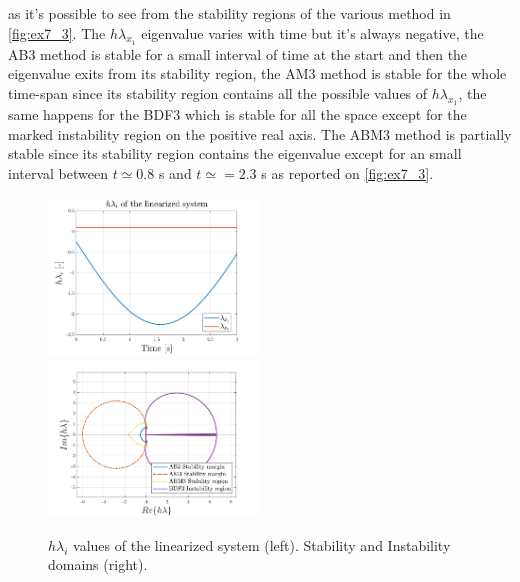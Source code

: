 \documentclass[11pt,a4paper,oneside]{article}
\begin{document}
as it's possible to see from the stability regions of the various method in \autoref{fig:ex7_3}. The $h\lambda_{x_1}$ 
eigenvalue varies with time but it's always negative, the AB3 method is stable for a small interval of time at the 
start and then the eigenvalue exits from its stability region, the AM3 method is stable for the whole time-span since
its stability region contains all the possible values of $h\lambda_{x_1}$, the same happens for the BDF3 which is stable
for all the space except for the marked instability region on the positive real axis. The ABM3 method is partially stable
since its stability region contains the eigenvalue except for an small interval between $t\simeq0.8$ s and $t\simeq=2.3$ s 
as reported on \autoref{fig:ex7_3}.


\begin{figure}[h]
    \includegraphics[width=0.495\textwidth]{gfx/ex7_5.pdf}
    \includegraphics[width=0.495\textwidth]{gfx/ex7_6.pdf}
    \caption{$h\lambda_i$ values of the linearized system (left). Stability and Instability domains (right).}
    \label{fig:ex7_3}
\end{figure}





\clearpage
\end{document}
